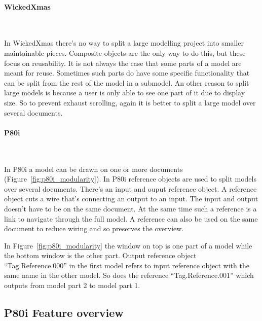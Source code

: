 \documentclass[a4paper,11pt,final]{article}
\begin{document}
\paragraph{WickedXmas}\

In WickedXmas there's no way to split a large modelling project into smaller
maintainable pieces. Composite objects are the only way to do this, but
these focus on reusability. It is not always the case that some parts of a
model are meant for reuse. Sometimes such parts do have some specific
functionality that can be split from the rest of the model in a submodel.
An other reason to split large models is because a user is only able to see
one part of it due to display size. So to prevent exhaust
scrolling, again it is better to split a large model over several documents.
 
\paragraph{P80i}\

In P80i a model can be drawn on one or more documents (Figure~\ref{fig:p80i_modularity}). 
In P80i reference objects are used to split models over several documents. There's
an input and ouput reference object. A reference object cuts a wire that's connecting an
output to an input. The input and output doesn't have to be on the same document.
At the same time such a reference is a link to navigate through the full model.
A reference can also be used on the same document to reduce wiring and so
preserves the overview.

In Figure~\ref{fig:p80i_modularity} the window on top is one part of a model while the
bottom window is the other part. Output reference object ``Tag.Reference.000'' in the
first model refers to input reference object with the same name in the other model. So does
the reference ``Tag.Reference.001'' which outputs from model part 2 to model part 1.

\subsection{P80i Feature overview}
\end{document}
